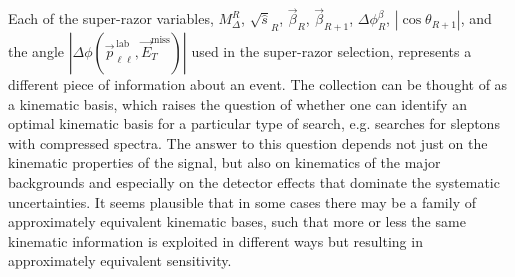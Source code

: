 Each of the super-razor variables, $M_{\Delta}^{R}$, $\sqrt{\hat{s}}_{R}$, $\vec{\beta}_{R}$, $\vec{\beta}_{R+1}$, $\Delta \phi_{R}^{\beta}$, 
$|\cos\theta_{R+1}|$, and the angle $|\Delta\phi (\vec{p}_{\ell\ell}^{\, \text{lab}},\vec{E}_{T}^\text{miss})|$
used in the super-razor selection,
represents a different piece of information about an event.
The collection can be thought of as a kinematic basis, which raises the question of whether one
can identify an optimal kinematic basis for a particular type of search, e.g. searches for
sleptons with compressed spectra. The answer to this question depends not just on the
kinematic properties of the signal, but also on kinematics of the major backgrounds and
especially on the detector effects that dominate the systematic uncertainties. It seems plausible that in some cases there may be a family of approximately equivalent kinematic bases, such that
more or less the same kinematic information is exploited in different ways but resulting in
approximately equivalent sensitivity. 




